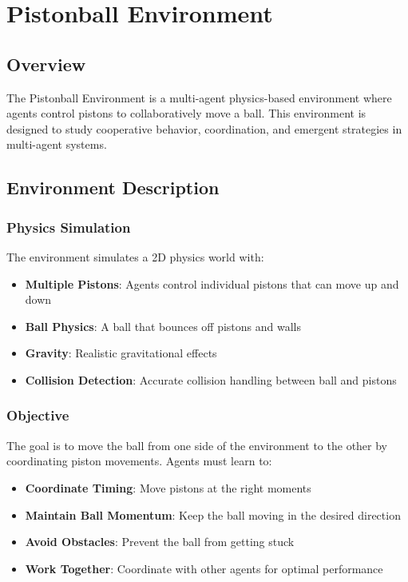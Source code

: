 \chapter{Pistonball Environment}

\section{Overview}

The Pistonball Environment is a multi-agent physics-based environment where agents control pistons to collaboratively move a ball. This environment is designed to study cooperative behavior, coordination, and emergent strategies in multi-agent systems.

\section{Environment Description}

\subsection{Physics Simulation}

The environment simulates a 2D physics world with:
\begin{itemize}
    \item \textbf{Multiple Pistons}: Agents control individual pistons that can move up and down
    \item \textbf{Ball Physics}: A ball that bounces off pistons and walls
    \item \textbf{Gravity}: Realistic gravitational effects
    \item \textbf{Collision Detection}: Accurate collision handling between ball and pistons
\end{itemize}

\subsection{Objective}

The goal is to move the ball from one side of the environment to the other by coordinating piston movements. Agents must learn to:
\begin{itemize}
    \item \textbf{Coordinate Timing}: Move pistons at the right moments
    \item \textbf{Maintain Ball Momentum}: Keep the ball moving in the desired direction
    \item \textbf{Avoid Obstacles}: Prevent the ball from getting stuck
    \item \textbf{Work Together}: Coordinate with other agents for optimal performance
\end{itemize}

